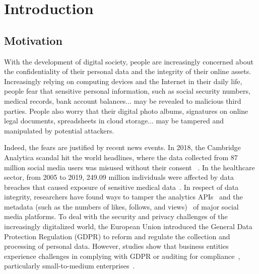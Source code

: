 \chapter{Introduction}

\section{Motivation}

With the development of digital society, people are increasingly
concerned about the confidentiality of their personal data and
the integrity of their online assets. Increasingly relying on
computing devices and the Internet in their daily life, people fear that
sensitive personal information, such as social security numbers,
medical records, bank account balances... may be revealed to malicious
third parties. People also worry that their digital photo albums,
signatures on online legal documents, spreadsheets in cloud storage...
may be tampered and manipulated by potential attackers.

Indeed, the fears are justified by recent news events.
In 2018, the Cambridge Analytica scandal hit the world headlines,
where the data collected from 87 million social media users was misused
without their consent
~\parencite{cadwalladr2018facebook,kitchgaessner2017cambridge,gonzalez2019global,hinds2020wouldn}.
In the healthcare sector, from 2005 to 2019, 249.09 million individuals
were affected by data breaches that caused exposure of sensitive medical
data~\parencite{seh2020healthcare}. In respect of data integrity, researchers
have found ways to tamper the analytics APIs~\parencite{pfeffer2018tampering} and
the metadata (such as the numbers of likes, follows, and views)~\parencite{paquet2017can}
of major social media platforms. To deal with the security and privacy
challenges of the increasingly digitalized world, the European Union introduced
the General Data Protection Regulation (GDPR) to reform and regulate
the collection and processing of personal data. However, studies show
that business entities experience challenges in complying with GDPR
or auditing for compliance~\parencite{smirnova2024understanding},
particularly small-to-medium enterprises~\parencite{sirur2018we,freitas2018gdpr,harting2021impacts}.

